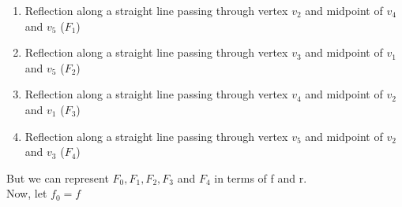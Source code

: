 \documentclass{article}
\begin{document}
\begin{enumerate}
\item{Reflection along a straight line passing through vertex $v_2$ and midpoint of $v_4$ and $v_5$ ($F_1$)}



\item{Reflection along a straight line passing through vertex $v_3$ and midpoint of $v_1$ and $v_5$  ($F_2$)}

\vspace{3cm}
\item{Reflection along a straight line passing through vertex $v_4$ and midpoint of $v_2$ and $v_1$  ($F_3$)}


\item{Reflection along a straight line passing through vertex $v_5$ and midpoint of $v_2$ and $v_3$ ($F_4$)}

\end{enumerate}


But we can represent $F_0,F_1,F_2,F_3$ and $F_4$  in terms of f and r.\\
Now, 
let $f_0=f$\\
\end{document}
